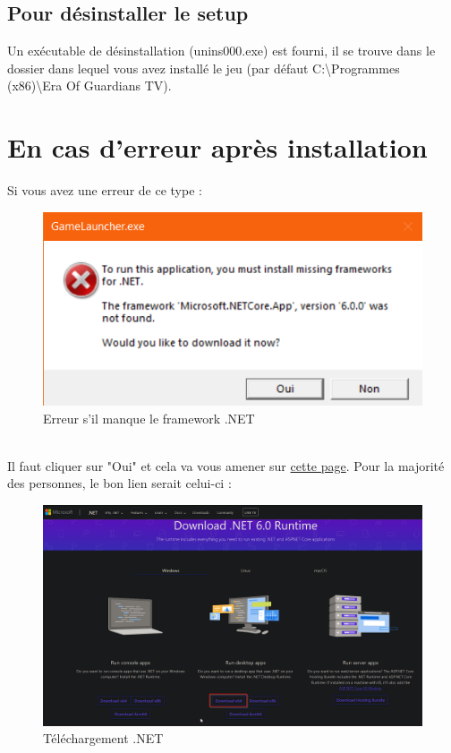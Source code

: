 \documentclass[a4paper, 12pt]{article}
\begin{document}
	\subsection{Pour désinstaller le setup}
	Un exécutable de désinstallation (unins000.exe) est fourni, il se trouve dans le dossier dans lequel vous avez installé le jeu (par défaut C:\textbackslash Programmes (x86)\textbackslash Era Of Guardians TV).  
	
	\section{En cas d'erreur après installation}
	Si vous avez une erreur de ce type : 
	\begin{figure}[ht]
		\centering
		\includegraphics[scale=0.4]{images/erreur.png}
		\caption{Erreur s'il manque le framework .NET}
	\end{figure}
	\\
	Il faut cliquer sur "Oui" et cela va vous amener sur \href{https://dotnet.microsoft.com/en-us/download/dotnet/6.0/runtime?cid=getdotnetcore}{cette page}.
	Pour la  majorité des personnes, le bon lien serait celui-ci : 
	\begin{figure}[h!]
		\centering
		\includegraphics[scale=0.35]{images/dotnet.png}
		\caption{Téléchargement .NET}
	\end{figure}	
	
\end{document}

